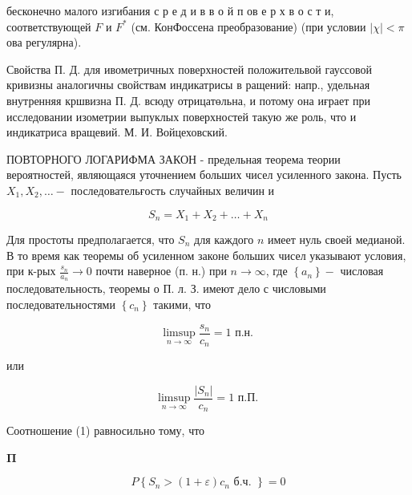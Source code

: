 \documentclass[10pt]{article}
\begin{document}
бесконечно малого изгибания с р е д и в в о й п ов е р х в о с т и, соответствующей $F$ и $F^{*}$ (см. КонФоссена преобразование) (при условии $|\chi|<\pi$ ова регулярна).



Свойства П. Д. для ивометричных поверхностей положительвой гауссовой кривизны аналогичны свойствам индикатрисы в ращений: напр., удельная внутренняя кршвизна П. Д. всюду отрицатөльна, и потому она иғрает при исследовании изометрии выпуклых поверхностей такую же роль, что и индикатриса вращевий. М. И. Войцеховский.



ПОВТОРНОГО ЛОГАРИФМА ЗАКОН - предельная теорема теории вероятностей, являющаяся уточнением больших чисел усиленного закона. Пусть $X_{1}, X_{2}, \ldots-$ последовательғость случайных величин и



\[

S_{n}=X_{1}+X_{2}+\ldots+X_{n}

\]



Для простоты предполагается, что $S_{n}$ для каждого $n$ имеет нуль своей медианой. В то время как теоремы об усиленном законе больших чисел указывают условия, при к-рых $\frac{s_{n}}{a_{n}} \rightarrow 0$ почти наверное (п. н.) при $n \rightarrow \infty$, где $\left\{a_{n}\right\}-$ числовая последовательность, теоремы о П. л. З. имеют дело с числовыми последовательностями $\left\{c_{n}\right\}$ такими, что



\[

\limsup _{n \rightarrow \infty} \frac{s_{n}}{c_{n}}=1 \text { п.н. }

\]



или



\[

\limsup _{n \rightarrow \infty} \frac{\left|S_{n}\right|}{c_{n}}=1 \text { п.П. }

\]



Соотношение (1) равносильно тому, что



$\boldsymbol{\Pi}$



\[

P\left\{S_{n}>(1+\varepsilon) c_{n} \text { б.ч. }\right\}=0

\]
\end{document}
